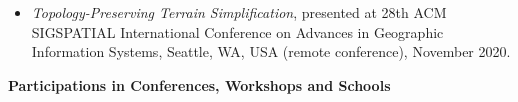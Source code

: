 \documentclass[11pt]{article}
\begin{document}
\begin{itemize}
\item {\em Topology-Preserving Terrain Simplification}, presented at 28th ACM SIGSPATIAL International Conference on Advances in Geographic Information Systems, Seattle, WA, USA (remote conference), November 2020.



\end{itemize}

\vspace*{2.5ex}
\noindent
{\Large\bf Participations in Conferences, Workshops and Schools}
\vspace*{0.5ex}
\end{document}
